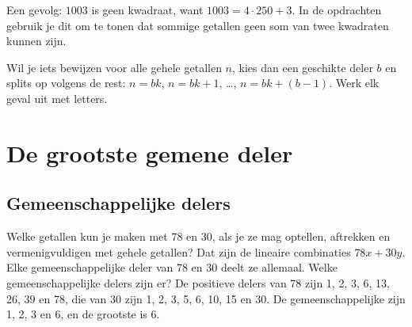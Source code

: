 
Een gevolg: $1003$ is geen kwadraat, want $1003 = 4 \cdot 250 + 3$. In de opdrachten gebruik je dit om te tonen dat sommige getallen geen som van twee kwadraten kunnen zijn.

\begin{werkwijze}
Wil je iets bewijzen voor alle gehele getallen $n$, kies dan een geschikte deler $b$ en splits op volgens de rest: $n = bk$, $n = bk + 1$, \ldots, $n = bk + (b - 1)$. Werk elk geval uit met letters.
\end{werkwijze}


\begin{oefeningen}
\end{oefeningen}

\section{De grootste gemene deler}

\subsection{Gemeenschappelijke delers}

Welke getallen kun je maken met 78 en 30, als je ze mag optellen, aftrekken en vermenigvuldigen met gehele getallen? Dat zijn de lineaire combinaties $78x + 30y$. Elke gemeenschappelijke deler van 78 en 30 deelt ze allemaal. Welke gemeenschappelijke delers zijn er? De positieve delers van 78 zijn 1, 2, 3, 6, 13, 26, 39 en 78, die van 30 zijn 1, 2, 3, 5, 6, 10, 15 en 30. De gemeenschappelijke zijn 1, 2, 3 en 6, en de grootste is 6.

